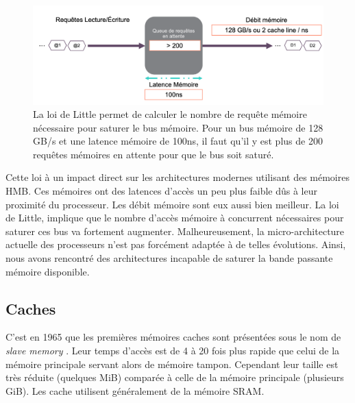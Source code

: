 \begin{figure}
    \center
    \includegraphics[width=12cm]{images/cpu_littlelaw.png}
    \caption{ La loi de Little permet de calculer le nombre de requête mémoire nécessaire pour saturer le bus mémoire. Pour un bus mémoire de 128 GB/s et une latence mémoire de 100ns, il faut qu'il y est plus de 200 requêtes mémoires en attente pour que le bus soit saturé.
    \label{pic_cpu_littlelaw}}
\end{figure}


Cette loi à un impact direct sur les architectures modernes utilisant des mémoires HMB. Ces mémoires ont des latences d’accès un peu plus faible dûs à leur proximité du processeur. Les débit mémoire sont eux aussi bien meilleur. La loi de Little, implique que le nombre d’accès mémoire à concurrent nécessaires pour saturer ces bus va fortement augmenter. Malheureusement, la micro-architecture actuelle des processeurs n’est pas forcément adaptée à de telles évolutions. Ainsi, nous avons rencontré des architectures incapable de saturer la bande passante mémoire disponible. 











\subsection{Caches} \label{sec:cache}
C'est en 1965 que les premières mémoires caches sont présentées sous le nom de \textit{slave memory} \cite{wilkes1965slave}. Leur temps d'accès est de 4 à 20 fois plus rapide que celui de la mémoire principale servant alors de mémoire tampon. Cependant leur taille est très réduite (quelques MiB) comparée à celle de la mémoire principale (plusieurs GiB). Les cache utilisent généralement de la mémoire SRAM.

